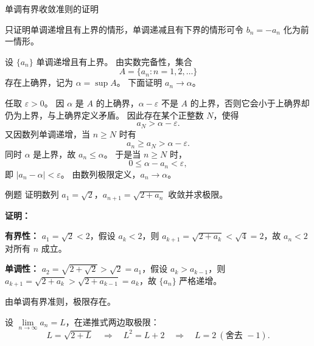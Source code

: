 \documentclass[aspectratio=169,10pt]{ctexbeamer}
\begin{document}
\begin{frame}{单调有界收敛准则的证明}
  
  只证明单调递增且有上界的情形，单调递减且有下界的情形可令 $b_n=-a_n$ 化为前一情形。
  
  设 $\{a_n\}$ 单调递增且有上界。 由实数完备性，集合
  \[
  A=\{a_n:n=1,2,\ldots\}
  \]
  存在上确界，记为 $\alpha=\sup A$。 下面证明 $a_n\to\alpha$。
  
  任取 $\varepsilon>0$。 因 $\alpha$ 是 $A$ 的上确界，$\alpha-\varepsilon$ 不是 $A$ 的上界，否则它会小于上确界却仍为上界，与上确界定义矛盾。 因此存在某个正整数 $N$，使得
  \[
  a_N>\alpha-\varepsilon.
  \]
  又因数列单调递增，当 $n\ge N$ 时有
  \[
  a_n\ge a_N>\alpha-\varepsilon.
  \]
  同时 $\alpha$ 是上界，故 $a_n\le \alpha$。 于是当 $n\ge N$ 时，
  \[
  0\le \alpha-a_n<\varepsilon,
  \]
  即 $|a_n-\alpha|<\varepsilon$。 由数列极限定义，$a_n\to\alpha$。
\end{frame}

\begin{frame}
 
  
  \begin{block}{例题}
      证明数列 \(a_1 = \sqrt{2}\)，\(a_{n+1} = \sqrt{2 + a_n}\) 收敛并求极限。
  \end{block}
  \pause
  \vspace{0.6cm}
  \textbf{证明：}
  
  \textbf{有界性：} \(a_1=\sqrt{2}<2\)，假设 \(a_k<2\)，则 \(a_{k+1}=\sqrt{2+a_k}<\sqrt4=2\)，故 \(a_n<2\) 对所有 \(n\) 成立。
  \vspace{0.2cm}
  
  \textbf{单调性：} \(a_2 = \sqrt{2+\sqrt{2}} > \sqrt{2} = a_1\)，假设 \(a_k > a_{k-1}\)，则 \(a_{k+1} = \sqrt{2 + a_k} > \sqrt{2 + a_{k-1}} = a_k\)，故 \(\{a_n\}\) 严格递增。
  
  \vspace{0.2cm}
  由单调有界准则，极限存在。
  
  设 \(\lim \limits_{n \to \infty}a_n = L\)，在递推式两边取极限：
  \[
  L = \sqrt{2 + L} \quad\Longrightarrow\quad L^2 = L + 2 \quad\Longrightarrow\quad L = 2\ (\text{舍去 } -1).
  \]
\end{frame}
\end{document}
